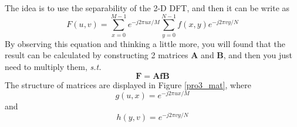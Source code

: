 \documentclass[11pt,a4paper]{article}
\begin{document}
The idea is to use the separability of the 2-D DFT, and then it can be write as 
\begin{equation}
	F(u,v)=\sum_{x=0}^{M-1}e^{-j2\pi ux/M}\sum_{y=0}^{N-1}f(x,y)e^{-j2\pi vy/N}
\end{equation}
By observing this equation and thinking a little more, you will found that the result
can be calculated by constructing 2 matrices \textbf{A} and \textbf{B}, and 
then you just need to multiply them, \emph{s.t.}
\begin{equation}
	\mathbf{F}=\mathbf{AfB}
\end{equation}
The structure of matrices are displayed in Figure \ref{pro3_mat}, where 
\begin{equation}
	g(u,x)=e^{-j2\pi ux/M}
\end{equation}
and
\begin{equation}
	h(y,v)=e^{-j2\pi vy/N}
\end{equation}
\end{document}
